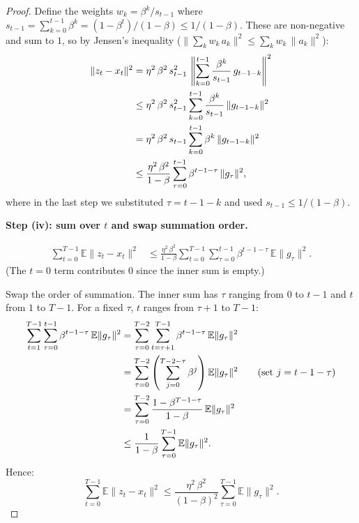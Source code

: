 \documentclass{article}
\begin{document}
\begin{proof}
Define the weights $w_k = \beta^k / s_{t-1}$ where
$s_{t-1} = \sum_{k=0}^{t-1}\beta^k = (1 - \beta^t)/(1-\beta) \leq 1/(1-\beta)$.
These are non-negative and sum to $1$, so by Jensen's inequality
($\|\sum_k w_k\,a_k\|^2 \leq \sum_k w_k\,\|a_k\|^2$):
\begin{align}
\|z_t - x_t\|^2
&= \eta^2\,\beta^2\,s_{t-1}^2\,
\left\|\sum_{k=0}^{t-1}\frac{\beta^k}{s_{t-1}}\,g_{t-1-k}\right\|^2
\notag \\
&\leq \eta^2\,\beta^2\,s_{t-1}^2\sum_{k=0}^{t-1}
\frac{\beta^k}{s_{t-1}}\,\|g_{t-1-k}\|^2
\notag \\
&= \eta^2\,\beta^2\,s_{t-1}\sum_{k=0}^{t-1}
\beta^k\,\|g_{t-1-k}\|^2
\notag \\
&\leq \frac{\eta^2\,\beta^2}{1-\beta}\sum_{\tau=0}^{t-1}
\beta^{t-1-\tau}\,\|g_\tau\|^2,
\label{eq:lem2_jensen}
\end{align}
where in the last step we substituted $\tau = t - 1 - k$ and used
$s_{t-1} \leq 1/(1-\beta)$.

\medskip
\noindent\textbf{Step (iv): sum over $t$ and swap summation order.}

\begin{align}
\sum_{t=0}^{T-1}\mathbb{E}\|z_t - x_t\|^2
&\leq \frac{\eta^2\,\beta^2}{1-\beta}\sum_{t=0}^{T-1}
\sum_{\tau=0}^{t-1}\beta^{t-1-\tau}\,\mathbb{E}\|g_\tau\|^2.
\label{eq:lem2_sum_raw}
\end{align}
(The $t = 0$ term contributes $0$ since the inner sum is empty.)

Swap the order of summation. The inner sum has $\tau$ ranging from $0$ to
$t-1$ and $t$ from $1$ to $T-1$. For a fixed $\tau$, $t$ ranges from
$\tau + 1$ to $T-1$:
\begin{align}
\sum_{t=1}^{T-1}\sum_{\tau=0}^{t-1}\beta^{t-1-\tau}\,\mathbb{E}\|g_\tau\|^2
&= \sum_{\tau=0}^{T-2}\sum_{t=\tau+1}^{T-1}
\beta^{t-1-\tau}\,\mathbb{E}\|g_\tau\|^2 \notag \\
&= \sum_{\tau=0}^{T-2}\left(\sum_{j=0}^{T-2-\tau}\beta^j\right)
\mathbb{E}\|g_\tau\|^2
\qquad\text{(set $j = t - 1 - \tau$)} \notag \\
&= \sum_{\tau=0}^{T-2}\frac{1 - \beta^{T-1-\tau}}{1-\beta}\,
\mathbb{E}\|g_\tau\|^2 \notag \\
&\leq \frac{1}{1-\beta}\sum_{\tau=0}^{T-1}\mathbb{E}\|g_\tau\|^2.
\label{eq:lem2_swap}
\end{align}
Hence:
\begin{equation}
\sum_{t=0}^{T-1}\mathbb{E}\|z_t - x_t\|^2
\leq \frac{\eta^2\,\beta^2}{(1-\beta)^2}\sum_{\tau=0}^{T-1}
\mathbb{E}\|g_\tau\|^2.
\label{eq:lem2_before_decomp}
\end{equation}


\end{proof}
\end{document}
